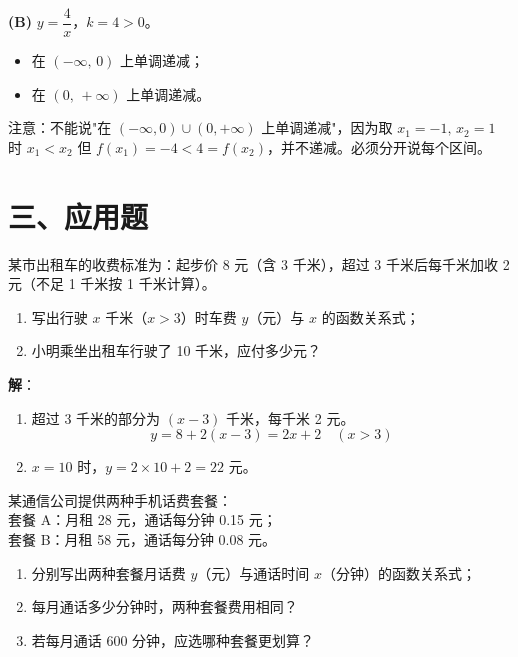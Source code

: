\documentclass[12pt, a4paper]{ctexart}
\begin{document}
\textbf{(B)} $y = \dfrac{4}{x}$，$k = 4 > 0$。
\begin{itemize}
  \item 在 $(-\infty,\,0)$ 上单调递减；
  \item 在 $(0,\,+\infty)$ 上单调递减。
\end{itemize}
注意：不能说"在 $(-\infty, 0) \cup (0, +\infty)$ 上单调递减"，因为取 $x_1=-1,\,x_2=1$ 时 $x_1 < x_2$ 但 $f(x_1)=-4 < 4=f(x_2)$，并不递减。必须分开说每个区间。

\section*{\textcolor{apppurple}{三、应用题}}

\begin{appbox}[【应用1】出租车计费问题]
某市出租车的收费标准为：起步价 8 元（含 3 千米），超过 3 千米后每千米加收 2 元（不足 1 千米按 1 千米计算）。
\begin{enumerate}[label=(\arabic*)]
  \item 写出行驶 $x$ 千米（$x > 3$）时车费 $y$（元）与 $x$ 的函数关系式；
  \item 小明乘坐出租车行驶了 10 千米，应付多少元？
\end{enumerate}
\end{appbox}

\textbf{解}：
\begin{enumerate}[label=(\arabic*)]
  \item 超过 3 千米的部分为 $(x - 3)$ 千米，每千米 2 元。
        \[
          y = 8 + 2(x - 3) = 2x + 2 \quad (x > 3)
        \]
  \item $x = 10$ 时，$y = 2 \times 10 + 2 = 22$ 元。
\end{enumerate}

\begin{appbox}[【应用2】手机话费方案选择]
某通信公司提供两种手机话费套餐：\\
套餐 A：月租 28 元，通话每分钟 0.15 元；\\
套餐 B：月租 58 元，通话每分钟 0.08 元。
\begin{enumerate}[label=(\arabic*)]
  \item 分别写出两种套餐月话费 $y$（元）与通话时间 $x$（分钟）的函数关系式；
  \item 每月通话多少分钟时，两种套餐费用相同？
  \item 若每月通话 600 分钟，应选哪种套餐更划算？
\end{enumerate}
\end{appbox}
\end{document}
